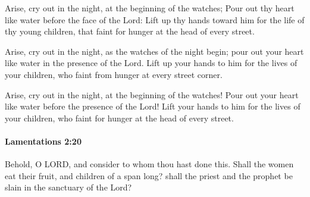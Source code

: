 			\begin{versebox}
					\item[BHS] 
					\item[LXX] 
					\item[ASV] Arise, cry out in the night, at the beginning of the watches; Pour out thy heart like water before the face of the Lord: Lift up thy hands toward him for the life of thy young children, that faint for hunger at the head of every street.
					\item[NIV] Arise, cry out in the night, as the watches of the night begin; pour out your heart like water in the presence of the Lord. Lift up your hands to him for the lives of your children, who faint from hunger at every street corner.
					\item[NRSV] Arise, cry out in the night, at the beginning of the watches! Pour out your heart like water before the presence of the Lord! Lift your hands to him for the lives of your children, who faint for hunger at the head of every street.
			\end{versebox}

		\paragraph{Lamentations 2:20} %
			\label{LAMENTATIONS-2-20}

			Behold, O LORD, and consider to whom thou hast done this. Shall the women eat their fruit, and children of a span long? shall the priest and the prophet be slain in the sanctuary of the Lord?

